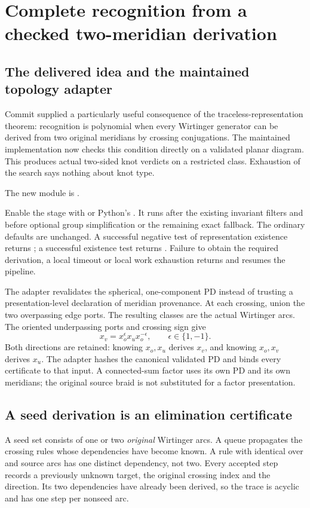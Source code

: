 \section{Complete recognition from a checked two-meridian derivation}
\label{sec:two-meridian}

\subsection{The delivered idea and the maintained topology adapter}
Commit  supplied a particularly useful consequence of the
traceless-representation theorem: recognition is polynomial when every
Wirtinger generator can be derived from two original meridians by crossing
conjugations. The maintained implementation now checks this condition directly
on a validated planar diagram. This produces actual two-sided knot verdicts
on a restricted class. Exhaustion of the search says nothing about knot type.

The new module is .

Enable the stage with  or Python's
. It runs after the existing invariant filters and
before optional group simplification or the remaining exact fallback. The
ordinary defaults are unchanged. A successful negative test of representation
existence returns ; a successful existence test returns
. Failure to obtain the required derivation, a local timeout or
local work exhaustion returns  and resumes the pipeline.

The adapter revalidates the spherical, one-component PD instead of trusting a
presentation-level declaration of meridian provenance. At each crossing,
union the two overpassing edge ports. The resulting classes are the actual
Wirtinger arcs. The oriented underpassing ports and crossing sign give
\[
 x_v=x_o^{\epsilon}x_u x_o^{-\epsilon},\qquad\epsilon\in\{1,-1\}.
\]
Both directions are retained: knowing $x_o,x_u$ derives $x_v$, and knowing
$x_o,x_v$ derives $x_u$. The adapter hashes the canonical validated PD and
binds every certificate to that input. A connected-sum factor uses its own
PD and its own meridians; the original source braid is not substituted for a
factor presentation.

\subsection{A seed derivation is an elimination certificate}
A seed set consists of one or two \emph{original} Wirtinger arcs. A queue
propagates the crossing rules whose dependencies have become known. A rule
with identical over and source arcs has one distinct dependency, not two.
Every accepted step records a previously unknown target, the original
crossing index and the direction. Its two dependencies have already been
derived, so the trace is acyclic and has one step per nonseed arc.

